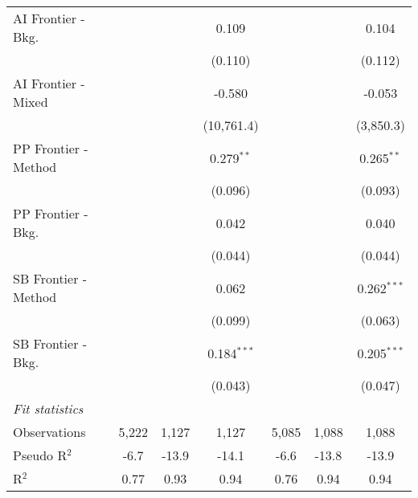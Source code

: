 \begin{tabular}{lcccccc}
   AI Frontier - Bkg.   &                &               & 0.109         &                &               & 0.104\\   
                        &                &               & (0.110)       &                &               & (0.112)\\   
   AI Frontier - Mixed  &                &               & -0.580        &                &               & -0.053\\   
                        &                &               & (10,761.4)    &                &               & (3,850.3)\\   
   PP Frontier - Method &                &               & 0.279$^{**}$  &                &               & 0.265$^{**}$\\   
                        &                &               & (0.096)       &                &               & (0.093)\\   
   PP Frontier - Bkg.   &                &               & 0.042         &                &               & 0.040\\   
                        &                &               & (0.044)       &                &               & (0.044)\\   
   SB Frontier - Method &                &               & 0.062         &                &               & 0.262$^{***}$\\   
                        &                &               & (0.099)       &                &               & (0.063)\\   
   SB Frontier - Bkg.   &                &               & 0.184$^{***}$ &                &               & 0.205$^{***}$\\   
                        &                &               & (0.043)       &                &               & (0.047)\\   
   \midrule
   \emph{Fit statistics}\\
   Observations         & 5,222          & 1,127         & 1,127         & 5,085          & 1,088         & 1,088\\  
   Pseudo R$^2$         & -6.7           & -13.9         & -14.1         & -6.6           & -13.8         & -13.9\\  
   R$^2$                & 0.77           & 0.93          & 0.94          & 0.76           & 0.94          & 0.94\\  
   

\end{tabular}

